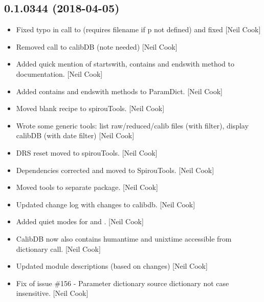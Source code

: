 \documentclass[a4paper,10pt,english]{report}
\begin{document}
\subsection{0.1.0344 (2018-04-05)}
\label{\detokenize{misc/changelog:id467}}\begin{itemize}
\item {} 
Fixed typo in call to  (requires filename if p not
defined) and fixed  {[}Neil Cook{]}

\item {} 
Removed call to calibDB (note needed) {[}Neil Cook{]}

\item {} 
Added quick mention of startswith, contains and endswith method to
documentation. {[}Neil Cook{]}

\item {} 
Added contains and endswith methods to ParamDict. {[}Neil Cook{]}

\item {} 
Moved blank recipe to spirouTools. {[}Neil Cook{]}

\item {} 
Wrote some generic tools: list raw/reduced/calib files (with filter),
display calibDB (with date filter) {[}Neil Cook{]}

\item {} 
DRS reset moved to spirouTools. {[}Neil Cook{]}

\item {} 
Dependencies corrected and moved to SpirouTools. {[}Neil Cook{]}

\item {} 
Moved tools to separate package. {[}Neil Cook{]}

\item {} 
Updated change log with changes to calibdb. {[}Neil Cook{]}

\item {} 
Added quiet modes for  and . {[}Neil Cook{]}

\item {} 
CalibDB now also contains humantime and unixtime accessible from
dictionary call. {[}Neil Cook{]}

\item {} 
Updated module descriptions (based on changes) {[}Neil Cook{]}

\item {} 
Fix of issue \#156 - Parameter dictionary source dictionary not case
insensitive. {[}Neil Cook{]}


\end{itemize}
\end{document}
